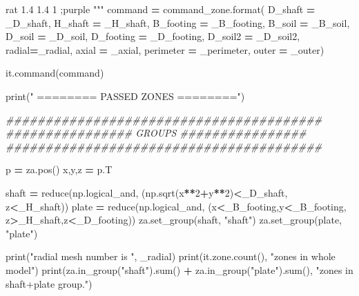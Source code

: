 \documentclass[a4paper, nobind]{templates/ociamthesis}
\newenvironment{Shaded}{\begin{snugshade}}{\end{snugshade}}
\newcommand{\BuiltInTok}[1]{#1}
\newcommand{\CommentTok}[1]{\textcolor[rgb]{0.56,0.35,0.01}{\textit{#1}}}
\newcommand{\DecValTok}[1]{\textcolor[rgb]{0.00,0.00,0.81}{#1}}
\newcommand{\NormalTok}[1]{#1}
\newcommand{\OperatorTok}[1]{\textcolor[rgb]{0.81,0.36,0.00}{\textbf{#1}}}
\newcommand{\StringTok}[1]{\textcolor[rgb]{0.31,0.60,0.02}{#1}}
\renewenvironment{Shaded}
{
  \vspace{10pt}%
  \begin{snugshade}%
}{%
  \end{snugshade}%
  \vspace{8pt}%
}
\begin{document}
\begin{Shaded}
\begin{Highlighting}[]
\StringTok{         rat 1.4 1.4 1 ;purple}
\StringTok{         }
\StringTok{"""}
\NormalTok{command }\OperatorTok{=}\NormalTok{ command\_zone.}\BuiltInTok{format}\NormalTok{(}
\NormalTok{D\_shaft }\OperatorTok{=}\NormalTok{ \_D\_shaft,}
\NormalTok{H\_shaft }\OperatorTok{=}\NormalTok{ \_H\_shaft,}
\NormalTok{B\_footing }\OperatorTok{=}\NormalTok{ \_B\_footing,}
\NormalTok{B\_soil }\OperatorTok{=}\NormalTok{ \_B\_soil,}
\NormalTok{D\_soil }\OperatorTok{=}\NormalTok{ \_D\_soil,}
\NormalTok{D\_footing }\OperatorTok{=}\NormalTok{ \_D\_footing,}
\NormalTok{D\_soil2 }\OperatorTok{=}\NormalTok{ \_D\_soil2,}
\NormalTok{radial}\OperatorTok{=}\NormalTok{\_radial,}
\NormalTok{axial }\OperatorTok{=}\NormalTok{ \_axial,}
\NormalTok{perimeter }\OperatorTok{=}\NormalTok{ \_perimeter,}
\NormalTok{outer }\OperatorTok{=}\NormalTok{ \_outer)}

\NormalTok{it.command(command)}

\BuiltInTok{print}\NormalTok{(}\StringTok{"               ======== PASSED ZONES ========"}\NormalTok{)}

\CommentTok{\#\#\#\#\#\#\#\#\#\#\#\#\#\#\#\#\#\#\#\#\#\#\#\#\#\#\#\#\#\#\#\#\#\#\#\#\#\#\#\#}
\CommentTok{\#\#\#\#\#\#\#\#\#\#\#\#\#\#\#\# GROUPS \#\#\#\#\#\#\#\#\#\#\#\#\#\#\#\#}
\CommentTok{\#\#\#\#\#\#\#\#\#\#\#\#\#\#\#\#\#\#\#\#\#\#\#\#\#\#\#\#\#\#\#\#\#\#\#\#\#\#\#\#}

\NormalTok{p }\OperatorTok{=}\NormalTok{ za.pos()}
\NormalTok{x,y,z }\OperatorTok{=}\NormalTok{ p.T}

\NormalTok{shaft }\OperatorTok{=} \BuiltInTok{reduce}\NormalTok{(np.logical\_and, (np.sqrt(x}\OperatorTok{**}\DecValTok{2}\OperatorTok{+}\NormalTok{y}\OperatorTok{**}\DecValTok{2}\NormalTok{)}\OperatorTok{\textless{}}\NormalTok{\_D\_shaft, z}\OperatorTok{\textless{}}\NormalTok{\_H\_shaft))}
\NormalTok{plate }\OperatorTok{=} \BuiltInTok{reduce}\NormalTok{(np.logical\_and, (x}\OperatorTok{\textless{}}\NormalTok{\_B\_footing,y}\OperatorTok{\textless{}}\NormalTok{\_B\_footing, z}\OperatorTok{\textgreater{}}\NormalTok{\_H\_shaft,z}\OperatorTok{\textless{}}\NormalTok{\_D\_footing))}
\NormalTok{za.set\_group(shaft, }\StringTok{"shaft"}\NormalTok{) }
\NormalTok{za.set\_group(plate, }\StringTok{"plate"}\NormalTok{)}

\BuiltInTok{print}\NormalTok{(}\StringTok{"radial mesh number is "}\NormalTok{, \_radial)}
\BuiltInTok{print}\NormalTok{(it.zone.count(), }\StringTok{"zones in whole model"}\NormalTok{)}
\BuiltInTok{print}\NormalTok{(za.in\_group(}\StringTok{"shaft"}\NormalTok{).}\BuiltInTok{sum}\NormalTok{() }\OperatorTok{+}\NormalTok{ za.in\_group(}\StringTok{"plate"}\NormalTok{).}\BuiltInTok{sum}\NormalTok{(), }\StringTok{"zones in shaft+plate group."}\NormalTok{) }


\end{Highlighting}
\end{Shaded}
\end{document}
